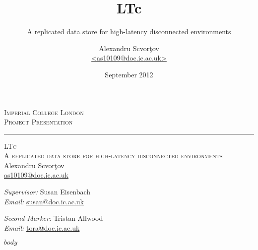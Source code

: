 \documentclass[ignorenonframetext]{beamer}
\title{LTc}
\subtitle{A replicated data store for high-latency disconnected environments}
\author{Alexandru Scvor\c tov\\\url{<as10109@doc.ic.ac.uk>}}
\date{September 2012}
\begin{document}
\begin{frame}[plain]

  \begin{center}
    \textsc{Imperial College London}\\
    \textsc{Project Presentation}\\[0.3cm]

    \hrule

    \vspace{0.5cm}

    \textsc{\large LTc}\\
    \textsc{A replicated data store for high-latency disconnected environments}\\[0.5cm]

    Alexandru Scvor\c tov\\
    \url{as10109@doc.ic.ac.uk}
  \end{center}

  \vfill

  \emph{Supervisor:} Susan Eisenbach\\
  \emph{Email:} \url{susan@doc.ic.ac.uk}

  \vspace{0.2cm}

  \emph{Second Marker:} Tristan Allwood\\
  \emph{Email:} \url{tora@doc.ic.ac.uk}

\end{frame}

$body$
\end{document}
